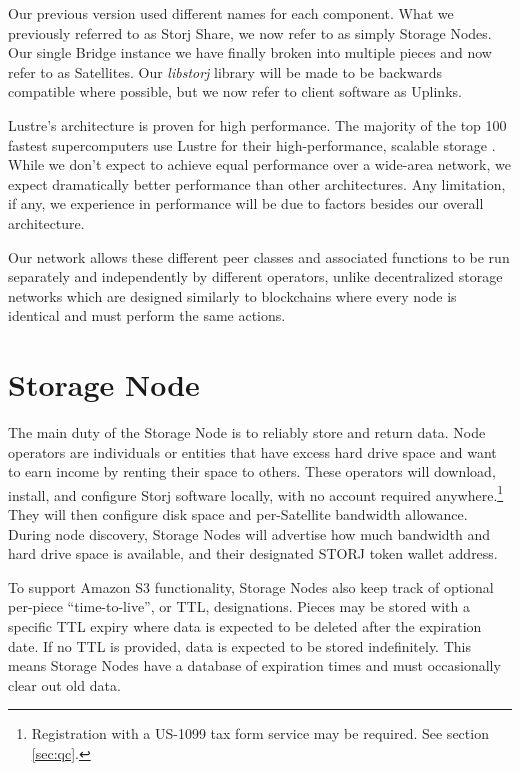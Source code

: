 \documentclass[8pt,fleqn,openany]{book}
\begin{document}
Our previous version used different names for each component. What we
previously referred to as Storj Share, we now refer to as simply Storage Nodes.
Our single Bridge instance we have finally broken into multiple pieces and now
refer to as Satellites. Our {\em libstorj} library will be made to be backwards
compatible where possible, but we now refer to client software as
Uplinks.

Lustre's architecture is proven for high performance. The majority of the top
100 fastest supercomputers use Lustre for their high-performance, scalable
storage \cite{lustre}. While we don't expect to achieve equal performance over
a wide-area network, we expect dramatically better performance than other
architectures. Any limitation, if any, we experience in performance will be
due to factors besides our overall architecture.

Our network allows these different peer classes and associated functions to be
run separately and independently by different operators, unlike decentralized
storage networks which are designed similarly to blockchains where every node
is identical and must perform the same actions.

\section{Storage Node}\label{sec:concrete-storage-nodes}

The main duty of the Storage Node is to reliably store and return data.
Node operators
are individuals or entities that have excess hard drive space and want to earn
income by renting their space to others. These operators will
download,
install, and configure Storj software locally, with no account required
anywhere.\footnote{Registration with a US-1099 tax form service may be
required. See section \ref{sec:qc}.}
They will then configure disk space and per-Satellite bandwidth allowance.
During node discovery, Storage Nodes will advertise how much bandwidth and
hard drive space is available, and their designated STORJ token wallet address.

To support Amazon S3 functionality,
Storage Nodes also keep track of optional per-piece ``time-to-live'', or TTL,
designations.
Pieces may be stored with a specific TTL expiry where data is expected to
be deleted after the expiration date. If no TTL is provided, data is expected
to be stored indefinitely. This means Storage Nodes have a database of
expiration
times and must occasionally clear out old data.
\end{document}
